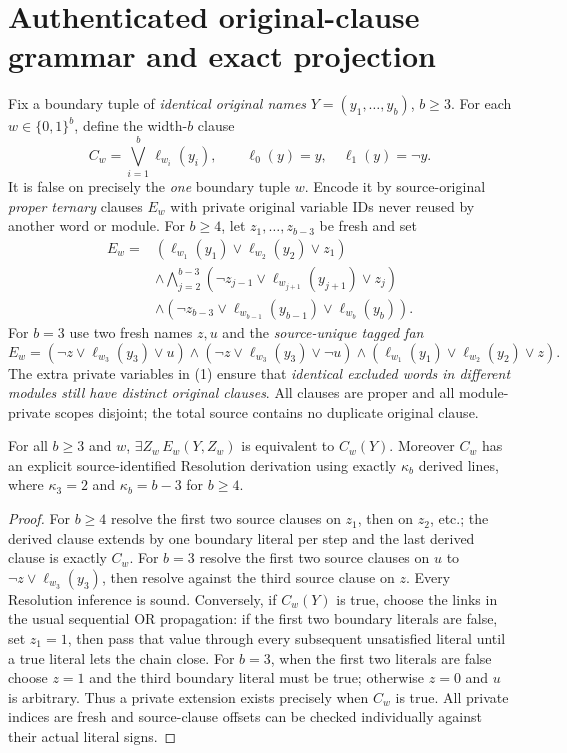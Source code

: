 \section{Authenticated original-clause grammar and exact projection}
Fix a boundary tuple of \emph{identical original names} $Y=(y_1,\ldots,y_b)$, $b\ge3$. For each $w\in\{0,1\}^b$, define the width-$b$ clause
\[
 C_w=\bigvee_{i=1}^b\ell_{w_i}(y_i),\qquad
 \ell_0(y)=y,\quad \ell_1(y)=\neg y.
\]
It is false on precisely the \emph{one} boundary tuple $w$. Encode it by source-original \emph{proper ternary} clauses $E_w$ with private original variable IDs never reused by another word or module. For $b\ge4$, let $z_1,\dots,z_{b-3}$ be fresh and set
\begin{align*}
E_w={}&(\ell_{w_1}(y_1)\vee\ell_{w_2}(y_2)\vee z_1)\\
 &\land\bigwedge_{j=2}^{b-3}(\neg z_{j-1}\vee\ell_{w_{j+1}}(y_{j+1})\vee z_j)\\
 &\land(\neg z_{b-3}\vee\ell_{w_{b-1}}(y_{b-1})\vee\ell_{w_b}(y_b)).
\end{align*}
For $b=3$ use two fresh names $z,u$ and the \emph{source-unique tagged fan}
\begin{equation}
E_w=(\neg z\vee\ell_{w_3}(y_3)\vee u)\land
(\neg z\vee\ell_{w_3}(y_3)\vee\neg u)\land
(\ell_{w_1}(y_1)\vee\ell_{w_2}(y_2)\vee z).\tag{1}
\end{equation}
The extra private variables in (1) ensure that \emph{identical excluded words in different modules still have distinct original clauses}. All clauses are proper and all module-private scopes disjoint; the total source contains no duplicate original clause.

\begin{lemma}\label{lem:projection}
For all $b\ge3$ and $w$, $\exists Z_w\,E_w(Y,Z_w)$ is equivalent to $C_w(Y)$. Moreover $C_w$ has an explicit source-identified Resolution derivation using exactly $\kappa_b$ derived lines, where $\kappa_3=2$ and $\kappa_b=b-3$ for $b\ge4$.
\end{lemma}
\begin{proof}
For $b\ge4$ resolve the first two source clauses on $z_1$, then on $z_2$, etc.; the derived clause extends by one boundary literal per step and the last derived clause is exactly $C_w$. For $b=3$ resolve the first two source clauses on $u$ to $\neg z\vee\ell_{w_3}(y_3)$, then resolve against the third source clause on $z$. Every Resolution inference is sound. Conversely, if $C_w(Y)$ is true, choose the links in the usual sequential OR propagation: if the first two boundary literals are false, set $z_1=1$, then pass that value through every subsequent unsatisfied literal until a true literal lets the chain close. For $b=3$, when the first two literals are false choose $z=1$ and the third boundary literal must be true; otherwise $z=0$ and $u$ is arbitrary. Thus a private extension exists precisely when $C_w$ is true. All private indices are fresh and source-clause offsets can be checked individually against their actual literal signs.\end{proof}

